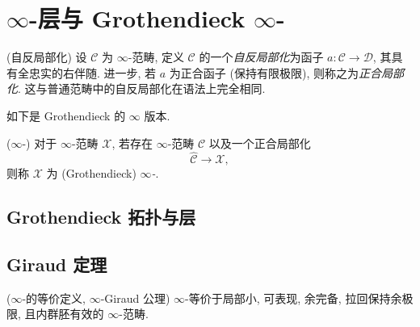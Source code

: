 \chapter{$\infty$-层与 Grothendieck $\infty$-\topos{}}




\minitoc








\begin{definition}
	{(自反局部化)}
	设 $\mathcal C$ 为 $\infty$-范畴, 定义 $\mathcal C$ 的一个\emph{自反局部化}为函子 $a\colon \mathcal C\to \mathcal D$, 其具有全忠实的右伴随.
	进一步, 若 $a$ 为正合函子 (保持有限极限), 则称之为\emph{正合局部化}.
	这与普通范畴中的自反局部化在语法上完全相同.
\end{definition}

如下是 Grothendieck \topos{}的 $\infty$ 版本.

\begin{definition}
	{($\infty$-\topos{})}
	对于 $\infty$-范畴 $\mathcal X$, 若存在 $\infty$-范畴 $\mathcal C$ 以及一个正合局部化
	$$ \widehat {\mathcal C} \to \mathcal X, $$ 则称 $\mathcal X$ 为 (Grothendieck) \emph{$\infty$-\topos{}}.
\end{definition}





\section{Grothendieck 拓扑与层}


\section{Giraud 定理}

\begin{prop}
	{($\infty$-\topos{}的等价定义, $\infty$-Giraud 公理)}
	$\infty$-\topos{}等价于局部小, 可表现, 余完备, 拉回保持余极限, 且内群胚有效的 $\infty$-范畴.
\end{prop}

